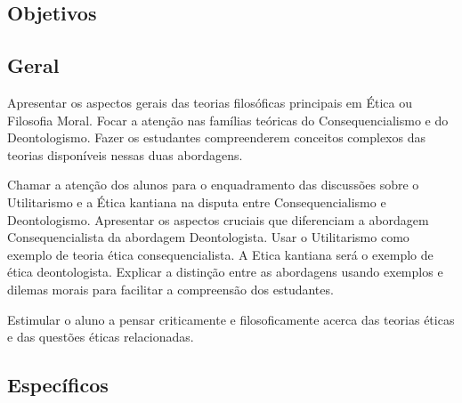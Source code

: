 \documentclass[
	article,			%
	12pt,				%
	twoside,			%
	a4paper,			%
	english,			%
	brazil,				%
	sumario=tradicional
]{plano}
\begin{document}

\frenchspacing



\imprimirletterUFSC





\textual
\pagestyle{notasUFSC}



\begin{snugshade}
	\section{Objetivos} %
\end{snugshade}

\subsection{Geral} %
%

Apresentar os aspectos gerais das teorias filosóficas principais em Ética ou Filosofia Moral. Focar a atenção nas famílias teóricas do Consequencialismo e do Deontologismo. Fazer os estudantes compreenderem conceitos complexos das teorias disponíveis nessas duas abordagens.

Chamar a atenção dos alunos para o enquadramento das discussões sobre o Utilitarismo e a Ética kantiana na disputa entre Consequencialismo e Deontologismo. Apresentar os aspectos cruciais que diferenciam a abordagem Consequencialista da abordagem Deontologista. Usar o Utilitarismo como exemplo de teoria ética consequencialista. A Etica kantiana será o exemplo de ética deontologista. Explicar a distinção entre as abordagens usando exemplos e dilemas morais para facilitar a compreensão dos estudantes.

Estimular o aluno a pensar criticamente e filosoficamente acerca das teorias éticas e das questões éticas relacionadas.

\subsection{Específicos} %
\end{document}
